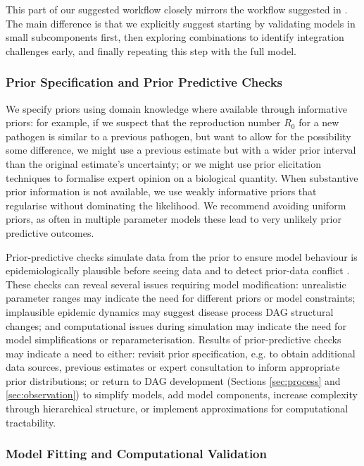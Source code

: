 \documentclass{article}
\begin{document}
This part of our suggested workflow closely mirrors the workflow suggested in \citet{gelman2020bayesian}.
The main difference is that we explicitly suggest starting by validating models in small subcomponents first, then exploring combinations to identify integration challenges early, and finally repeating this step with the full model.

\subsubsection{Prior Specification and Prior Predictive Checks}

We specify priors using domain knowledge where available through informative priors: for example, if we suspect that the reproduction number $R_0$ for a new pathogen is similar to a previous pathogen, but want to allow for the possibility some difference, we might use a previous estimate but with a wider prior interval than the original estimate's uncertainty; or we might use prior elicitation techniques \citep{o2006uncertain} to formalise expert opinion on a biological quantity. When substantive prior information is not available, we use weakly informative priors that regularise without dominating the likelihood. We recommend avoiding uniform priors, as often in multiple parameter models these lead to very unlikely prior predictive outcomes.

Prior-predictive checks simulate data from the prior to ensure model behaviour is epidemiologically plausible before seeing data and to detect prior-data conflict \citep{Box1980,yang2025detecting}.
These checks can reveal several issues requiring model modification: unrealistic parameter ranges may indicate the need for different priors or model constraints; implausible epidemic dynamics may suggest disease process \ac{DAG} structural changes; and computational issues during simulation may indicate the need for model simplifications or reparameterisation.
Results of prior-predictive checks may indicate a need to either: revisit prior specification, e.g. to obtain additional data sources, previous estimates or expert consultation to inform appropriate prior distributions; or return to \ac{DAG} development (Sections \ref{sec:process} and \ref{sec:observation}) to simplify models, add model components, increase complexity through hierarchical structure, or implement approximations for computational tractability.

\subsubsection{Model Fitting and Computational Validation}
\end{document}
